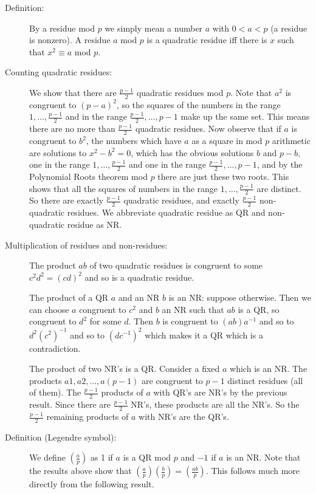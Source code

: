 \documentclass[12pt]{article}
\begin{document}
\begin{description}

\item[Definition:]  By a residue mod $p$ we simply mean a number $a$ with $0 < a <p$ (a residue is nonzero).  A residue $a$ mod $p$ is a quadratic residue iff there is $x$ such that $x^2 \equiv a$ mod $p$.

\item[Counting quadratic residues:]  We show that there are $\frac{p-1}2$ quadratic residues mod $p$.   Note that $a^2$ is congruent to $(p-a)^2$, so the squares of the numbers in the range $1,\ldots,\frac{p-1}2$ and in the range $\frac{p-1}2,\ldots,p-1$ make up the same set.
This means there are no more than $\frac{p-1}2$ quadratic residues.   Now observe that if $a$ is congruent to $b^2$, the numbers which have $a$ as a square in mod $p$ arithmetic are solutions to $x^2-b^2=0$, which has the obvious solutions $b$ and $p-b$, one in  the range $1,\ldots,\frac{p-1}2$ and one in the range $\frac{p-1}2,\ldots,p-1$, and by the Polynomial Roots theorem mod $p$ there are just these two roots.   This shows that all the squares of numbers in the range $1,\ldots,\frac{p-1}2$
are distinct.  So there are exactly $\frac{p-1}2$ quadratic residues, and exactly $\frac{p-1}2$ non-quadratic residues.   We abbreviate quadratic residue as QR and non-quadratic residue as NR.

\item[Multiplication of residues and non-residues:]   The product $ab$ of two quadratic residues is congruent to some $c^2d^2=(cd)^2$ and so is a quadratic residue.

The product of a QR $a$ and an NR $b$ is an NR:  suppose otherwise.  Then we can choose $a$ congruent to $c^2$ and $b$ an NR such that $ab$ is a QR, so congruent to $d^2$ for some $d$.   Then $b$ is congruent to $(ab)a^{-1}$ and
so to $d^2(c^2)^{-1}$ and so to $(dc^{-1})^2$ which makes it a QR which is a contradiction.

The product of two NR's is a QR.  Consider a fixed $a$ which is an NR.   The products $a1, a2,\ldots,a(p-1)$  are congruent to $p-1$ distinct residues (all of them).   The $\frac{p-1}2$ products of $a$ with QR's are NR's
by the previous result.   Since there are $\frac{p-1}2$ NR's, these products are all the NR's.  So the  $\frac{p-1}2$ remaining products of $a$ with NR's are the QR's.

\item[Definition (Legendre symbol):]  We define $\left(\frac ap\right)$ as 1 if $a$ is a QR mod $p$ and $-1$ if $a$ is an NR.  Note that the results above show that $\left(\frac ap\right)\left(\frac bp\right)=\left(\frac {ab}p\right)$.   This follows much
more directly from the following result.


\end{description}
\end{document}
